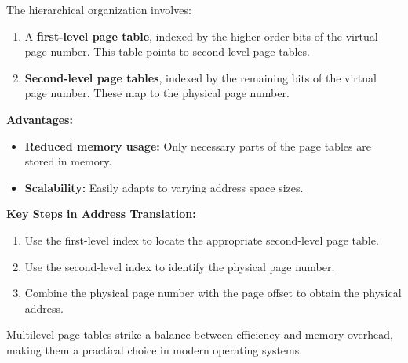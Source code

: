 The hierarchical organization involves:
\begin{enumerate}
    \item A \textbf{first-level page table}, indexed by the higher-order bits of the virtual page number. This table points to second-level page tables.
    \item \textbf{Second-level page tables}, indexed by the remaining bits of the virtual page number. These map to the physical page number.
\end{enumerate}

\textbf{Advantages:} \\
\begin{itemize}
    \item \textbf{Reduced memory usage:} Only necessary parts of the page tables are stored in memory.
    \item \textbf{Scalability:} Easily adapts to varying address space sizes.
\end{itemize}

\textbf{Key Steps in Address Translation:} \\
\begin{enumerate}
    \item Use the first-level index to locate the appropriate second-level page table.
    \item Use the second-level index to identify the physical page number.
    \item Combine the physical page number with the page offset to obtain the physical address.
\end{enumerate}

Multilevel page tables strike a balance between efficiency and memory overhead, making them a practical choice in modern operating systems.

